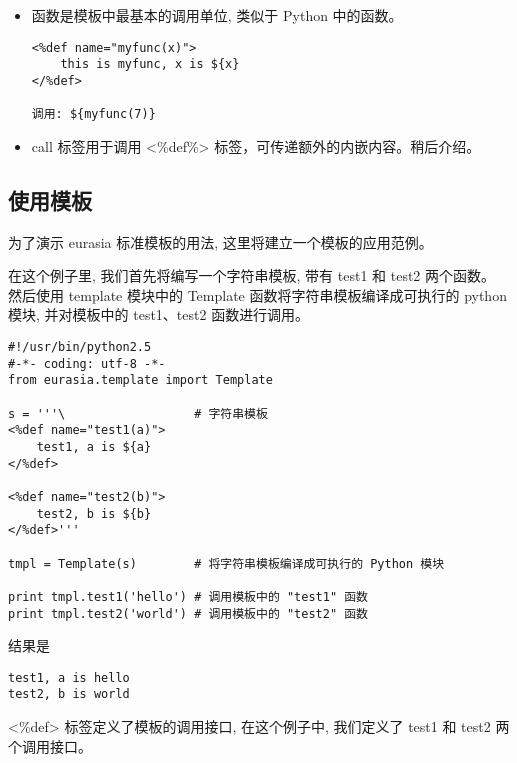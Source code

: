 \documentclass{manual}
\begin{document}
\begin{itemize}
\item {}

函数是模板中最基本的调用单位, 类似于 Python 中的函数。

\begin{verbatim}
<%def name="myfunc(x)">
    this is myfunc, x is ${x}
</%def>

调用: ${myfunc(7)}
\end{verbatim}

\item {}

call 标签用于调用 <\%def\%> 标签，可传递额外的内嵌内容。稍后介绍。

\end{itemize}

\subsection{使用模板}

为了演示 eurasia 标准模板的用法, 这里将建立一个模板的应用范例。

在这个例子里, 我们首先将编写一个字符串模板, 带有 test1 和 test2 两个函数。
然后使用 template 模块中的 Template 函数将字符串模板编译成可执行的 python 模块,
并对模板中的 test1、test2 函数进行调用。

\begin{verbatim}
#!/usr/bin/python2.5
#-*- coding: utf-8 -*-
from eurasia.template import Template

s = '''\                  # 字符串模板
<%def name="test1(a)">
	test1, a is ${a}
</%def>

<%def name="test2(b)">
	test2, b is ${b}
</%def>'''

tmpl = Template(s)        # 将字符串模板编译成可执行的 Python 模块

print tmpl.test1('hello') # 调用模板中的 "test1" 函数
print tmpl.test2('world') # 调用模板中的 "test2" 函数
\end{verbatim}

结果是

\begin{verbatim}
test1, a is hello
test2, b is world
\end{verbatim}

<\%def> 标签定义了模板的调用接口, 在这个例子中, 我们定义了 test1 和 test2 两个调用接口。

\end{document}
